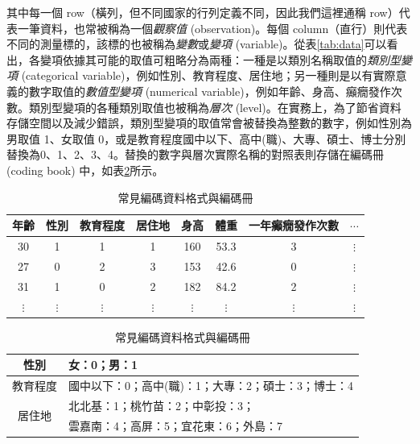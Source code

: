     其中每一個 row（橫列，但不同國家的行列定義不同，因此我們這裡通稱 row）代表一筆資料，也常被稱為一個\textit{觀察值} (observation)。每個 column（直行）則代表不同的測量標的，該標的也被稱為\textit{變數}或\textit{變項} (variable)。從表\ref{tab:data}可以看出，各變項依據其可能的取值可粗略分為兩種：一種是以類別名稱取值的\textit{類別型變項} (categorical variable)，例如性別、教育程度、居住地；另一種則是以有實際意義的數字取值的\textit{數值型變項} (numerical variable)，例如年齡、身高、癲癇發作次數。類別型變項的各種類別取值也被稱為\textit{層次} (level)。在實務上，為了節省資料存儲空間以及減少錯誤，類別型變項的取值常會被替換為整數的數字，例如性別為男取值 1、女取值 0，或是教育程度國中以下、高中(職)、大專、碩士、博士分別替換為0、1、2、3、4。替換的數字與層次實際名稱的對照表則存儲在編碼冊 (coding book) 中，如表\ref{tab:data_coding}所示。

    \newpage

    \begin{table}[htbp]
        \begin{center}
            \begin{tabular}{cccccccc}
                \toprule
                年齡 & 性別 & 教育程度 & 居住地 & 身高 & 體重 & 一年癲癇發作次數 & $\cdots$\\
                \hline
                30 & 1 & 1 & 1 & 160 & 53.3 & 3 & $\vdots$ \\
                27 & 0 & 2 & 3 & 153 & 42.6 & 0 & $\vdots$ \\
                31 & 1 & 0 & 2 & 182 & 84.2 & 2 & $\vdots$ \\
                $\vdots$ & $\vdots$ & $\vdots$ & $\vdots$ & $\vdots$ & $\vdots$ & $\vdots$ & $\vdots$ \\
                \bottomrule
            \end{tabular}

            \bigskip

            \begin{tabular}{c|l}
                \toprule
                性別 & 女：0；男：1\\
                \hline
                教育程度 & 國中以下：0；高中(職)：1；大專：2；碩士：3；博士：4\\
                \hline
                \multirow{2}{*}{居住地} & 北北基：1；桃竹苗：2；中彰投：3；\\
                & 雲嘉南：4；高屏：5；宜花東：6；外島：7\\
                \bottomrule
            \end{tabular}
            \caption{常見編碼資料格式與編碼冊\label{tab:data_coding}}
        \end{center}
    \end{table}

